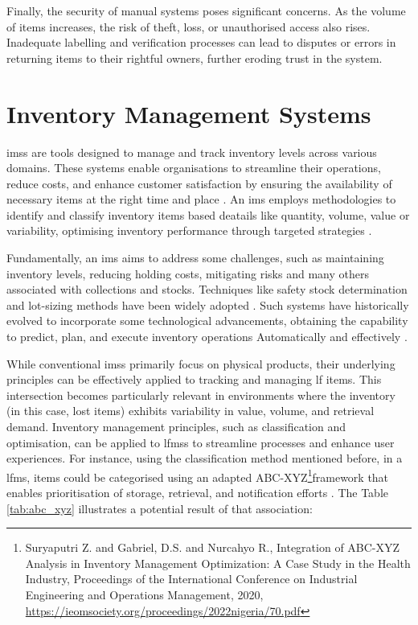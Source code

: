 Finally, the security of manual systems poses significant concerns. As the volume of items increases, the risk of theft, loss, or unauthorised access also rises. Inadequate labelling and verification processes can lead to disputes or errors in returning items to their rightful owners, further eroding trust in the system.



\section{Inventory Management Systems} \label{sec:ims}

\acp{ims} are tools designed to manage and track inventory levels across various domains. These systems enable organisations to streamline their operations, reduce costs, and enhance customer satisfaction by ensuring the availability of necessary items at the right time and place \cite{Pauliina2024}. An \ac{ims} employs methodologies to identify and classify inventory items based deatails like quantity, volume, value or variability, optimising inventory performance through targeted strategies \cite{Pauliina2024}.

Fundamentally, an \ac{ims} aims to address some challenges, such as maintaining inventory levels, reducing holding costs, mitigating risks and many others associated with collections and stocks. Techniques like safety stock determination and lot-sizing methods have been widely adopted \cite{Prabakaran2023}. Such systems have historically evolved to incorporate some technological advancements, obtaining the capability to predict, plan, and execute inventory operations Automatically and effectively \cite{Chebet2019}.

While conventional \acp{ims} primarily focus on physical products, their underlying principles can be effectively applied to tracking and managing \ac{lf} items. This intersection becomes particularly relevant in environments where the inventory (in this case, lost items) exhibits variability in value, volume, and retrieval demand. Inventory management principles, such as classification and optimisation, can be applied to \acp{lfms} to streamline processes and enhance user experiences. For instance, using the classification method mentioned before, in a \ac{lfms}, items could be categorised using an adapted ABC-XYZ\footnote{Suryaputri Z. and Gabriel, D.S. and Nurcahyo R., Integration of ABC-XYZ Analysis in Inventory Management Optimization: A Case Study in the Health Industry, Proceedings of the International Conference on Industrial Engineering and Operations Management, 2020, \url{https://ieomsociety.org/proceedings/2022nigeria/70.pdf}}framework that enables prioritisation of storage, retrieval, and notification efforts \cite{Khobragade2018}. The Table \ref{tab:abc_xyz} illustrates a potential result of that association:

